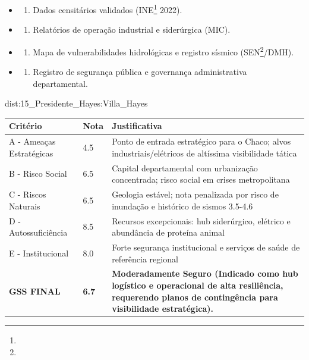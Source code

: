 {\begin{itemize}
\tightlist
\item
  \begin{enumerate}
  \def\labelenumi{\arabic{enumi})}
  \tightlist
  \item
    Dados censitários validados (INE\footnote{\fineINE} 2022).
  \end{enumerate}
\item
  \begin{enumerate}
  \def\labelenumi{\arabic{enumi})}
  \setcounter{enumi}{1}
  \tightlist
  \item
    Relatórios de operação industrial e siderúrgica (MIC).
  \end{enumerate}
\item
  \begin{enumerate}
  \def\labelenumi{\arabic{enumi})}
  \setcounter{enumi}{2}
  \tightlist
  \item
    Mapa de vulnerabilidades hidrológicas e registro sísmico (SEN\footnote{\fineSEN}/\allowbreak DMH).
  \end{enumerate}
\item
  \begin{enumerate}
  \def\labelenumi{\arabic{enumi})}
  \setcounter{enumi}{3}
  \tightlist
  \item
    Registro de segurança pública e governança administrativa
    departamental.
  \end{enumerate}
\end{itemize}}{dist:15_Presidente_Hayes:Villa_Hayes}
\begin{table}[ht!]
\small \begin{tabular}{p{3.0cm}p{0.8cm}p{6.0cm}} \toprule
\textbf{Critério} & \textbf{Nota} & \textbf{Justificativa} \\ \midrule
A - Ameaças Estratégicas & 4.5 & Ponto de entrada estratégico para o Chaco; alvos industriais/\allowbreak elétricos de altíssima visibilidade tática \\
B - Risco Social & 6.5 & Capital departamental com urbanização concentrada; risco social em crises metropolitana \\
C - Riscos Naturais & 6.5 & Geologia estável; nota penalizada por risco de inundação e histórico de sismos 3.5-4.6 \\
D - Autossuficiência & 8.5 & Recursos excepcionais: hub siderúrgico, elétrico e abundância de proteína animal \\
E - Institucional & 8.0 & Forte segurança institucional e serviços de saúde de referência regional \\
\midrule \textbf{GSS FINAL} & \textbf{6.7} & \textbf{Moderadamente Seguro (Indicado como hub logístico e operacional de alta resiliência, requerendo planos de contingência para visibilidade estratégica).} \\ \bottomrule \end{tabular}
\end{table}
